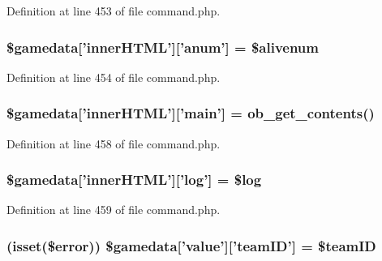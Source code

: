 Definition at line 453 of file command.\+php.

\hypertarget{command_8php_abc840bb3aade3c2e5c654f8d16a93a01}{
\subsubsection[{\$gamedata}]{\setlength{\rightskip}{0pt plus 5cm}\$gamedata\mbox{[}'inner\+H\+T\+M\+L'\mbox{]}\mbox{[}'anum'\mbox{]} = \$alivenum}}\label{command_8php_abc840bb3aade3c2e5c654f8d16a93a01}


Definition at line 454 of file command.\+php.

\hypertarget{command_8php_aea43421c223abcfe0f87eba2ed1a9c96}{
\subsubsection[{\$gamedata}]{\setlength{\rightskip}{0pt plus 5cm}\$gamedata\mbox{[}'inner\+H\+T\+M\+L'\mbox{]}\mbox{[}'main'\mbox{]} = ob\+\_\+get\+\_\+contents()}}\label{command_8php_aea43421c223abcfe0f87eba2ed1a9c96}


Definition at line 458 of file command.\+php.

\hypertarget{command_8php_ac0c8e341e5b5c1499ae39285ff039122}{
\subsubsection[{\$gamedata}]{\setlength{\rightskip}{0pt plus 5cm}\$gamedata\mbox{[}'inner\+H\+T\+M\+L'\mbox{]}\mbox{[}'log'\mbox{]} = \$log}}\label{command_8php_ac0c8e341e5b5c1499ae39285ff039122}


Definition at line 459 of file command.\+php.

\hypertarget{command_8php_a3bb7e13ced7e0a1819da876e71142b64}{
\subsubsection[{\$gamedata}]{ (isset(\$error)) \$gamedata\mbox{[}'{\bf value}'\mbox{]}\mbox{[}'team\+I\+D'\mbox{]} = \$team\+I\+D}}\label{command_8php_a3bb7e13ced7e0a1819da876e71142b64}


